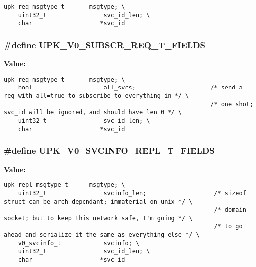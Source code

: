 \begin{Code}\begin{verbatim}upk_req_msgtype_t       msgtype; \
    uint32_t                svc_id_len; \
    char                   *svc_id
\end{verbatim}\end{Code}
\subsubsection{\setlength{\rightskip}{0pt plus 5cm}\#define UPK\_\-V0\_\-SUBSCR\_\-REQ\_\-T\_\-FIELDS}\label{v0__protocol__structs_8h_f3456a3f8b91f7df4cf5489b4d66c3c1}


\textbf{Value:}

\begin{Code}\begin{verbatim}upk_req_msgtype_t       msgtype; \
    bool                    all_svcs;                     /* send a req with all=true to subscribe to everything in */ \
                                                          /* one shot; svc_id will be ignored, and should have len 0 */ \
    uint32_t                svc_id_len; \
    char                   *svc_id
\end{verbatim}\end{Code}
\subsubsection{\setlength{\rightskip}{0pt plus 5cm}\#define UPK\_\-V0\_\-SVCINFO\_\-REPL\_\-T\_\-FIELDS}\label{v0__protocol__structs_8h_d18c68ae7a62387148d1afa2451ac02a}


\textbf{Value:}

\begin{Code}\begin{verbatim}upk_repl_msgtype_t      msgtype; \
    uint32_t                svcinfo_len;                   /* sizeof struct can be arch dependant; immaterial on unix */ \
                                                           /* domain socket; but to keep this network safe, I'm going */ \
                                                           /* to go ahead and serialize it the same as everything else */ \
    v0_svcinfo_t            svcinfo; \
    uint32_t                svc_id_len; \
    char                   *svc_id
\end{verbatim}\end{Code}
